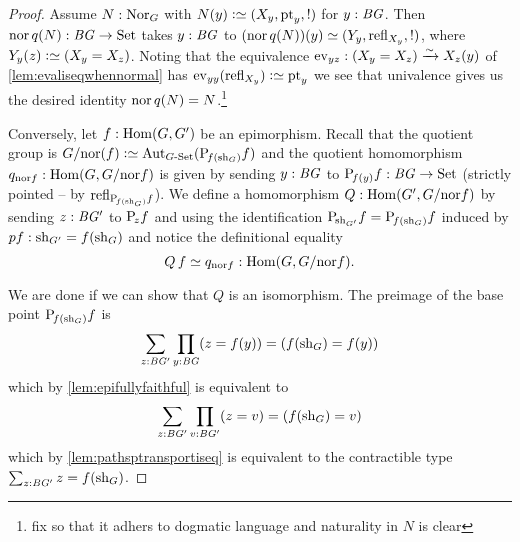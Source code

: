 \begin{proof}
  Assume $N:\mathrm{Nor}_G$ with $N(y)\defequi(X_y,\pt_y,!)$ for $y:\mathit{B}\mathit{G}$.
  Then $\nor\, q(N):\BG\to\Set$ takes $y:\mathit{B}\mathit{G}$ to $(\nor\, q(N))(y)\oldequiv(Y_y,\refl{X_y},!)$, where $Y_y(z)\defequi (X_y=X_z)$.
  Noting that the equivalence $\mathrm{ev}_{yz}:(X_y=X_z)\xrightarrow{\sim} X_z(y)$ of \cref{lem:evaliseqwhennormal} has $\mathrm{ev}_{yy}(\refl{X_y})\defequi \pt_y$ we see that univalence gives us the desired identity $\nor\, q(N)=N$.\footnote{fix so that it adhers to dogmatic language and naturality in $N$ is clear}

  Conversely, let $f:\Hom(G,G')$ be an epimorphism.
  Recall that the quotient group is $G/\nor(f)\defequi\aut_{G\text{-}\Set}(\pathsp{f(\sh_G)}f)$ and the quotient homomorphism $q_{\nor f}:\Hom(G,G/\nor f)$ is given by sending $y:\mathit{B}\mathit{G}$ to $\mathrm{P}_{\!f(y)}f:\mathit{B}\mathit{G}\to\mathrm{Set}$ (strictly pointed -- \ie by $\mathrm{refl}_{\mathrm{P}_{\!f(\mathrm{sh}_G)}f}$).
  We define a homomorphism $Q:\Hom(G',G/\nor f)$ by sending $z:\mathit{B}\mathit{G}'$ to $\mathrm{P}_{\!z}f$ and using the identification $\mathrm{P}_{\!\mathrm{sh}_{G'}}f=\mathrm{P}_{\!f(\mathrm{sh}_G)}f$ induced by $pf:\mathrm{sh}_{G'}=f(\mathrm{sh}_G)$ and notice the definitional equality
  $$Q\,f\oldequiv q_{\nor f}:\Hom(G,G/\nor f).$$

We are done if we can show that $Q$ is an isomorphism.
The preimage of the base point $\mathrm{P}_{\!f(\mathrm{sh}_G)}f$ is
$$\sum_{z:\mathit{B}\mathit{G}'}\prod_{y:\mathit{B}\mathit{G}}(z=f(y))=(f(\mathrm{sh}_G)=f(y))$$
which by
\cref{lem:epifullyfaithful} is equivalent to
$$\sum_{z:\mathit{B}\mathit{G}'}\prod_{v:\mathit{B}\mathit{G}'}(z=v)=(f(\mathrm{sh}_G)=v)$$
which by \cref{lem:pathsptransportiseq} is equivalent to the contractible type $\sum_{z:\mathit{B}\mathit{G}'}z=f(\mathrm{sh}_G)$.
\end{proof}

